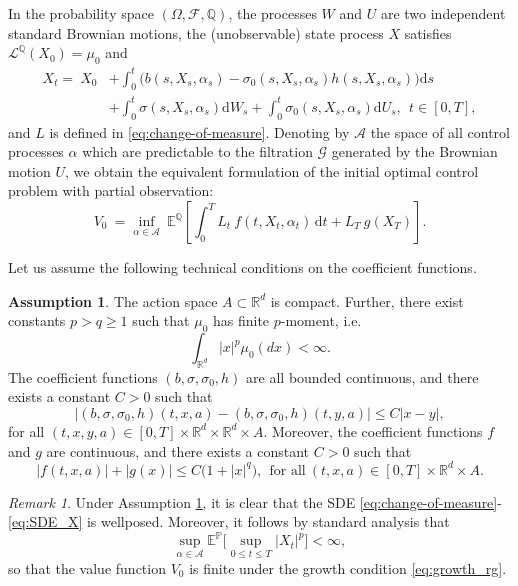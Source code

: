 \documentclass[11pt]{article}
\numberwithin{equation}{section}
\theoremstyle{plain}
\theoremstyle{definition}
\newtheorem{assumption}{Assumption}
\theoremstyle{remark}
\newtheorem{remark}[theorem]{Remark}
\newcommand{\Q}{\mathbb{Q}}
\newcommand{\R}{\mathbb{R}}
\newcommand{\dd}{\mathrm{d}}
\newcommand{\Om}{\Omega}
\newcommand{\Fc}{\mathcal{F}}
\newcommand{\bP}{\mathbb{P}}
\newcommand{\x}{\times}
\begin{document}
	\vspace{0.5em}
	
	In the probability space $(\Om, \Fc, \Q)$, the processes $W$ and $U$ are two independent standard Brownian motions,
	the (unobservable) state process $X$ satisfies $\mathcal{L}^{\Q}(X_0) = \mu_0$ and
	\begin{align} \label{eq:SDE_X}
		X_t 
		=~
		X_0 
		& +
		\int_0^t \big(b(s, X_s,  \alpha_s) - \sigma_0(s, X_s, \alpha_s ) h(s,X_s, \alpha_s) \big) \dd s \nonumber \\
		& +
		\int_0^t \sigma(s, X_s,  \alpha_s)\dd W_s 
		+ 
		\int_0^t \sigma_0(s, X_s, \alpha_s)\dd U_s, 
		~~t \in [0,T],
	\end{align}
	and $L$ is defined in \eqref{eq:change-of-measure}.
	Denoting by $\mathcal{A}$ the space of all control processes $\alpha$ which are predictable to the filtration $\mathcal{G}$ generated by the Brownian motion $U$,
	we obtain the equivalent formulation of the initial optimal control problem with partial observation:
	\begin{equation} \label{eq:reform_V0}
		V_0 
		~=
		\inf_{\alpha \in \mathcal{A}} ~
		\mathbb{E}^{\mathbb{Q}} 
		\left[ 
		\int_0^T L_t ~f(t, X_t,  \alpha_t)\,\dd t 
		+
		L_T~ g(X_T) 
		\right]. 
	\end{equation}
	
	Let us assume the following technical conditions on the coefficient functions.
	
	\begin{assumption} \label{assum:coeff}
		The action space $A \subset \R^d$ is compact.
		Further, there exist constants $p > q \ge 1$ such that $\mu_0$ has finite $p$-moment, i.e. 
		$$
		\int_{\R^d} |x|^p \mu_0(dx) < \infty.
		$$
		The coefficient functions $(b, \sigma, \sigma_0, h)$ are all bounded continuous, and there exists a constant $C> 0$ such that
		$$
		\big| (b, \sigma, \sigma_0, h) (t,x,a) - (b, \sigma, \sigma_0, h)(t,y,a) \big| 
		\le 
		C |x-y|,
		$$
		for all $(t,x,y,a) \in [0,T] \x \R^d \x \R^d \x A$.
		Moreover, the coefficient functions $f$ and $g$ are continuous, and there exists a constant $C> 0$ such that
		\begin{equation} \label{eq:growth_rg}
			\big| f(t,x,a) \big| + \big| g(x) \big| 
			\le
			C \big(1+ |x|^q \big),
			~~\mbox{for all}~
			(t,x,a) \in [0,T] \x \R^d \x A.
		\end{equation}
	\end{assumption}
	
	\begin{remark}
		Under Assumption \ref{assum:coeff}, it is clear that the SDE \eqref{eq:change-of-measure}-\eqref{eq:SDE_X} is wellposed.
		Moreover, it follows by standard analysis that 
		$$
		\sup_{\alpha \in \mathcal{A}}
		\mathbb{E}^{\bP} \bigg[ \sup_{0 \le t \le T} \big| X_t \big|^p \bigg] < \infty,
		$$
		so that the value function $V_0$ is finite under the growth condition \eqref{eq:growth_rg}.
	\end{remark}
	
\end{document}
